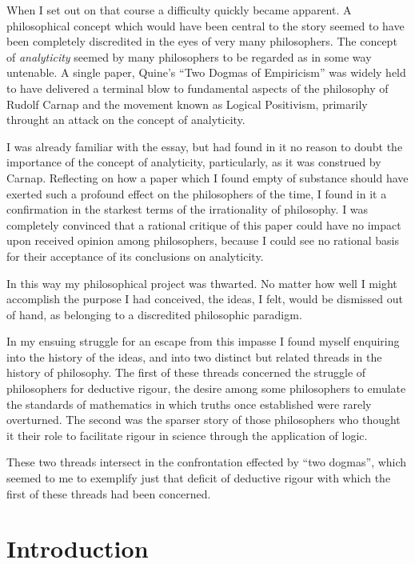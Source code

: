 When I set out on that course a difficulty quickly became apparent.
A philosophical concept which would have been central to the story seemed to have been completely discredited in the eyes of very many philosophers.
The concept of {\it analyticity} seemed by many philosophers to be regarded as in some way untenable.
A single paper, Quine's ``Two Dogmas of Empiricism'' was widely held to have delivered a terminal blow to fundamental aspects of the philosophy of Rudolf Carnap and the movement known as Logical Positivism, primarily throught an attack on the concept of analyticity.

I was already familiar with the essay, but had found in it no reason to doubt the importance of the concept of analyticity, particularly, as it was construed by Carnap.
Reflecting on how a paper which I found empty of substance should have exerted such a profound effect on the philosophers of the time, I found in it a confirmation in the starkest terms of the irrationality of philosophy.
I was completely convinced that a rational critique of this paper could have no impact upon received opinion among philosophers, because I could see no rational basis for their acceptance of its conclusions on analyticity.

In this way my philosophical project was thwarted.
No matter how well I might accomplish the purpose I had conceived, the ideas, I felt, would be dismissed out of hand, as belonging to a discredited philosophic paradigm.

In my ensuing struggle for an escape from this impasse I found myself enquiring into the history of the ideas, and into two distinct but related threads in the history of philosophy.
The first of these threads concerned the struggle of philosophers for deductive rigour, the desire among some philosophers to emulate the standards of mathematics in which truths once established were rarely overturned.
The second was the sparser story of those philosophers who thought it their role to facilitate rigour in science through the application of logic.

These two threads intersect in the confrontation effected by ``two dogmas'', which seemed to me to exemplify just that deficit of deductive rigour with which the first of these threads had been concerned.




\mainmatter

\chapter{Introduction}

